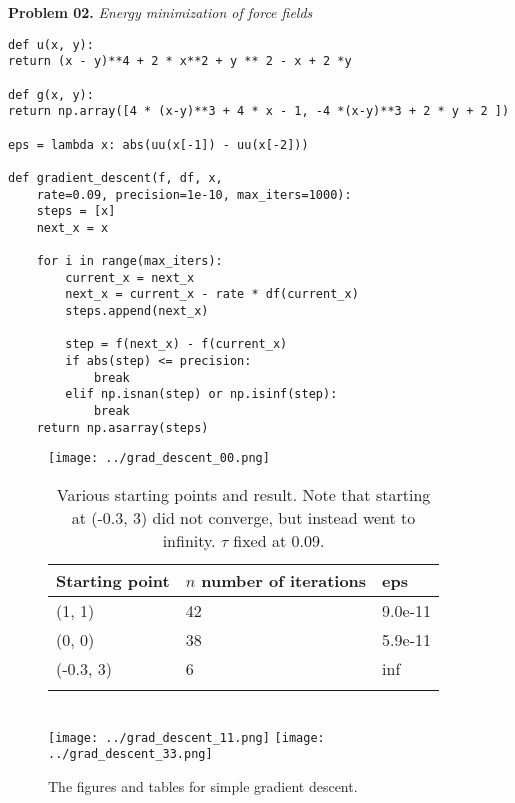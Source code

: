 \documentclass{article}
\newcommand{\exnum}{02} %
\newcounter{problem}[section]
\newenvironment{prob}[1]
{
    \refstepcounter{problem}
    \Large{\textbf{Problem \exnum.\theproblem}  \qquad \textit{#1}}
    \begin{enumerate}[label=\alph*]
    \normalsize
}{
    \end{enumerate}
}
\begin{document}
\begin{prob}{Energy minimization of force fields}
\begin{lstlisting}[frame=single]
def u(x, y):
return (x - y)**4 + 2 * x**2 + y ** 2 - x + 2 *y

def g(x, y):
return np.array([4 * (x-y)**3 + 4 * x - 1, -4 *(x-y)**3 + 2 * y + 2 ])

eps = lambda x: abs(uu(x[-1]) - uu(x[-2]))

def gradient_descent(f, df, x, 
	rate=0.09, precision=1e-10, max_iters=1000):
	steps = [x]
	next_x = x
	
	for i in range(max_iters):
		current_x = next_x
		next_x = current_x - rate * df(current_x)
		steps.append(next_x)
		
		step = f(next_x) - f(current_x)
		if abs(step) <= precision:
			break
		elif np.isnan(step) or np.isinf(step):
			break
	return np.asarray(steps)
\end{lstlisting}


\begin{figure}
	\centering
	\texttt{[image: ../grad\_descent\_00.png]}\quad%
	\begin{minipage}[b][0.4\textheight][c]{.45\linewidth} 
		\begin{longtable}[]{@{}lll@{}}
			\toprule
			Starting point & $n$ number of iterations & eps \tabularnewline
			\midrule
			\endhead
			(1, 1) & 42 & 9.0e-11 \tabularnewline
			(0, 0) & 38 & 5.9e-11 \tabularnewline
			(-0.3, 3) & 6 & inf \tabularnewline
			\bottomrule
			\caption{Various starting points and result. Note that starting at (-0.3, 3) did not converge, but instead went to infinity. $\tau$ fixed at 0.09.}
		\end{longtable}
	\end{minipage}\\[1em]
	\texttt{[image: ../grad\_descent\_11.png]}\quad%
	\texttt{[image: ../grad\_descent\_33.png]}
	\caption{The figures and tables for simple gradient descent.}
	\label{fig:problem02}
\end{figure}



\end{prob}
\end{document}
